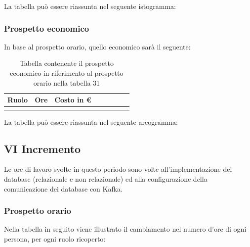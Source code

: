 			La tabella può essere riassunta nel seguente istogramma:
			
			
		\subsubsection{Prospetto economico}
			In base al prospetto orario, quello economico sarà il seguente: 
			
			\begin{longtable}{|c|c|c|c|c|c|c|c}
				\hline
				\rowcolor{lighter-grayer}
				\textbf{Ruolo} & \textbf{Ore} & \textbf{Costo in €} \\
				\hline
				\endfirsthead
				
				\caption{Tabella contenente il prospetto economico in riferimento al prospetto orario nella tabella 31}
			\end{longtable}
			\pagebreak
			
			La tabella può essere riassunta nel seguente areogramma:

		
		
		\subsection{VI Incremento}
		Le ore di lavoro svolte in questo periodo sono volte all'implementazione dei database (relazionale e non relazionale) ed alla configurazione della comunicazione dei database con Kafka.
		\subsubsection{Prospetto orario}
			Nella tabella in seguito viene illustrato il cambiamento nel numero d'ore di ogni persona, per ogni ruolo ricoperto:
			
